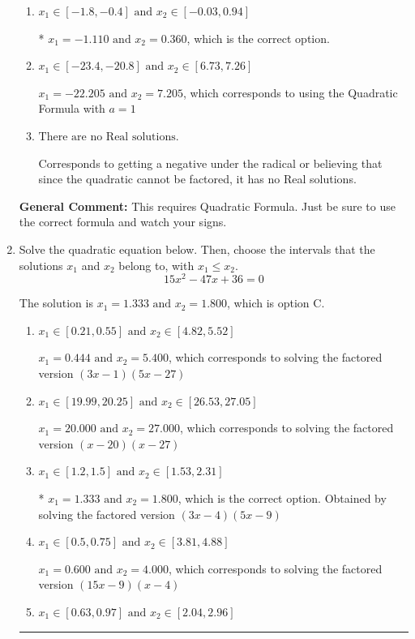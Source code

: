 \documentclass{extbook}[14pt]
\newcommand{\litem}[1]{\item #1

\rule{\textwidth}{0.4pt}}
\begin{document}
\begin{enumerate}
{\begin{enumerate}[label=\Alph*.]
 $x_1 = -29.786 \text{ and } x_2 = 29.036$, which corresponds to writing the Quadratic Formula as $-\frac{b}{2a} \pm \sqrt{b^2 - 4ac}$.
\item \( x_1 \in [-1.8, -0.4] \text{ and } x_2 \in [-0.03, 0.94] \)

* $x_1 = -1.110 \text{ and } x_2 = 0.360$, which is the correct option.
\item \( x_1 \in [-23.4, -20.8] \text{ and } x_2 \in [6.73, 7.26] \)

 $x_1 = -22.205 \text{ and } x_2 = 7.205$, which corresponds to using the Quadratic Formula with $a=1$
\item \( \text{There are no Real solutions.} \)

Corresponds to getting a negative under the radical or believing that since the quadratic cannot be factored, it has no Real solutions.
\end{enumerate}

\textbf{General Comment:} This requires Quadratic Formula. Just be sure to use the correct formula and watch your signs.
}
\litem{
Solve the quadratic equation below. Then, choose the intervals that the solutions $x_1$ and $x_2$ belong to, with $x_1 \leq x_2$.
\[ 15x^{2} -47 x + 36 = 0 \]

The solution is \( x_1 = 1.333 \text{ and } x_2 = 1.800 \), which is option C.\begin{enumerate}[label=\Alph*.]
\item \( x_1 \in [0.21, 0.55] \text{ and } x_2 \in [4.82, 5.52] \)

$x_1 = 0.444 \text{ and } x_2 = 5.400$, which corresponds to solving the factored version $(3x -1)(5x -27)$
\item \( x_1 \in [19.99, 20.25] \text{ and } x_2 \in [26.53, 27.05] \)

$x_1 = 20.000 \text{ and } x_2 = 27.000$, which corresponds to solving the factored version $(x -20)(x -27)$
\item \( x_1 \in [1.2, 1.5] \text{ and } x_2 \in [1.53, 2.31] \)

* $x_1 = 1.333 \text{ and } x_2 = 1.800$, which is the correct option. Obtained by solving the factored version $(3x -4)(5x -9)$
\item \( x_1 \in [0.5, 0.75] \text{ and } x_2 \in [3.81, 4.88] \)

$x_1 = 0.600 \text{ and } x_2 = 4.000$, which corresponds to solving the factored version $(15x -9)(x -4)$
\item \( x_1 \in [0.63, 0.97] \text{ and } x_2 \in [2.04, 2.96] \)


\end{enumerate}}
\end{enumerate}
\end{document}
